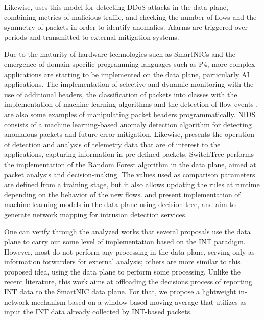 
Likewise, \cite{tr20_multi-feature} uses this model for detecting DDoS attacks in the data plane, combining metrics of malicious traffic, and checking the number of flows and the symmetry of packets in order to identify anomalies. Alarms are triggered over periods and transmitted to external mitigation systems.

Due to the maturity of hardware technologies such as SmartNICs and the emergence of domain-specific programming languages such as P4, more complex applications are starting to be implemented on the data plane, particularly AI applications. The implementation of selective and dynamic monitoring with the use of additional headers\cite{tr19_sampling-based}, the classification of packets into classes with the implementation of machine learning algorithms \cite{tr19_do_switches_dream} and the detection of flow events \cite{tr20_flow_event}, are also some examples of manipulating packet headers programmatically. NIDS \cite{tr20_anomaly_detection} consists of a machine learning-based anomaly detection algorithm for detecting anomalous packets and future error mitigation. Likewise, \cite{tr20_detection_of_fog} presents the operation of detection and analysis of telemetry data that are of interest to the applications, capturing information in pre-defined packets. SwitchTree \cite{tr20_switchtree} performs the implementation of the Random Forest algorithm in the data plane, aimed at packet analysis and decision-making. The values used as comparison parameters are defined from a training stage, but it also allows updating the rules at runtime depending on the behavior of the new flows. \cite{tr21_programmable_sw} and \cite{tr19_do_switches_dream, tr20_switchtree} present implementation of machine learning models in the data plane using decision tree, and aim to generate network mapping for intrusion detection services.

One can verify through the analyzed works that several proposals use the data plane to carry out some level of implementation based on the INT paradigm. However, most do not perform any processing in the data plane, serving only as information forwarders for external analysis; others are more similar to this proposed idea, using the data plane to perform some processing. Unlike the recent literature, this work aims at offloading the decisions process of reporting INT data to the SmartNIC data plane. For that, we propose a lightweight in-network mechanism based on a window-based moving average that utilizes as input the INT data already collected by INT-based packets.

